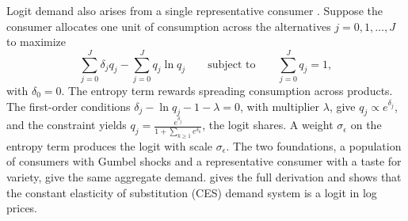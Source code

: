 \begin{remark}\label{rem:06-representative}
Logit demand also arises from a single representative consumer \citep{AndersonDePalmaThisse1988,AndersonDePalmaThisse1992}.
Suppose the consumer allocates one unit of consumption across the alternatives $j = 0, 1, \dots, J$ to maximize
\begin{equation*}
\sum_{j=0}^J \delta_j q_j - \sum_{j=0}^J q_j\ln q_j \qquad \text{subject to} \qquad \sum_{j=0}^J q_j = 1,
\end{equation*}
with $\delta_0 = 0$. The entropy term rewards spreading consumption across products. The first-order conditions
$\delta_j - \ln q_j - 1 - \lambda = 0$, with multiplier $\lambda$, give $q_j \propto e^{\delta_j}$, and the constraint
yields $q_j = \frac{e^{\delta_j}}{1 + \sum_{k\ge 1}e^{\delta_k}}$, the logit shares. A weight $\sigma_\epsilon$ on the entropy
term produces the logit with scale $\sigma_\epsilon$. The two foundations, a population of consumers with Gumbel
shocks and a representative consumer with a taste for variety, give the same aggregate demand.
 gives the full derivation and shows that the constant elasticity of substitution (CES) demand system is a logit in log prices.
\end{remark}
